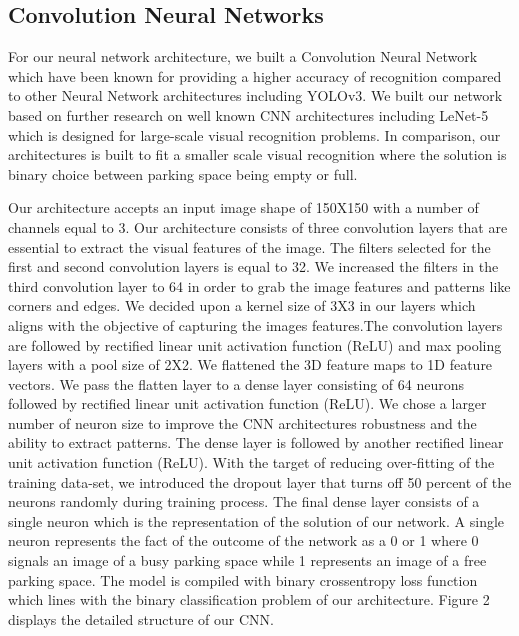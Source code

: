 \documentclass[conference]{IEEEtran}
\begin{document}
\subsection{Convolution Neural Networks}
For our neural network architecture, we built a Convolution Neural Network which have been known for providing a higher accuracy of recognition compared to other Neural Network architectures including YOLOv3. We built our network based on further research on well known CNN architectures including LeNet-5 which is designed for large-scale visual recognition problems. In comparison, our architectures is built to fit a smaller scale visual recognition where the solution is binary choice between parking space being empty or full. 

Our architecture accepts an input image shape of 150X150 with a number of channels equal to 3. Our architecture consists of three convolution layers that are essential to extract the visual features of the image. The filters selected for the first and second convolution layers is equal to 32. We increased the filters in the third convolution layer to 64 in order to grab the image features and patterns like corners and edges. We decided upon a kernel size of 3X3 in our layers which
aligns with the objective of capturing the images features.The convolution layers are followed by rectified linear unit activation function (ReLU) and max pooling layers with a pool size of 2X2. We flattened the 3D feature maps to 1D feature vectors. We pass the flatten layer to a dense layer consisting of 64 neurons followed by rectified linear unit activation function (ReLU). We chose a larger number of neuron size to improve the CNN architectures robustness and the ability to extract patterns. The dense layer is followed by another rectified linear unit activation function (ReLU). With the target of reducing over-fitting of the training data-set, we introduced the dropout layer that turns off 50 percent of the neurons randomly during training process. The final dense layer consists of a single neuron which is the representation of the solution of our network. A single neuron represents the fact of the outcome of the network as a 0 or 1 where 0 signals an image of a busy parking space while 1 represents an image of a free parking space. The model is compiled with binary crossentropy loss function which lines with the binary classification problem of our architecture. 
Figure 2 displays the detailed structure of our CNN.
\end{document}
